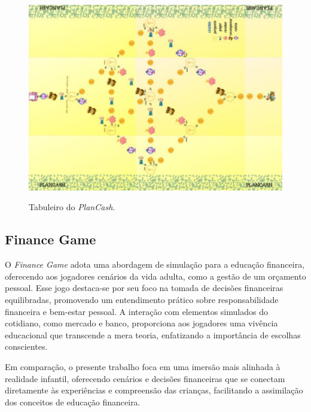 \begin{figure}[ht]
	\centering
	\caption{Tabuleiro do \textit{PlanCash}.}
	\includegraphics[scale=0.5]{Textuais/Pictures/Plancash-2.png}
	\label{fig:plancash-2}
\end{figure}

\newpage

\subsection{Finance Game}

O \textit{Finance Game} \cite{Finance_Game} adota uma abordagem de simulação para a educação financeira, oferecendo aos jogadores cenários da vida adulta, como a gestão de um orçamento pessoal. Esse jogo destaca-se por seu foco na tomada de decisões financeiras equilibradas, promovendo um entendimento prático sobre responsabilidade financeira e bem-estar pessoal. A interação com elementos simulados do cotidiano, como mercado e banco, proporciona aos jogadores uma vivência educacional que transcende a mera teoria, enfatizando a importância de escolhas conscientes.

Em comparação, o presente trabalho foca em uma imersão mais alinhada à realidade infantil, oferecendo cenários e decisões financeiras que se conectam diretamente às experiências e compreensão das crianças, facilitando a assimilação dos conceitos de educação financeira.

